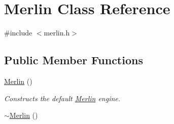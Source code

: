 \hypertarget{classMerlin}{}\section{Merlin Class Reference}
\label{classMerlin}


{\ttfamily \#include $<$merlin.\+h$>$}

\subsection*{Public Member Functions}
\begin{DoxyCompactItemize}
\item 
\hypertarget{classMerlin_af65be93499637052ab723eebb3bf4508}{}\hyperlink{classMerlin_af65be93499637052ab723eebb3bf4508}{Merlin} ()\label{classMerlin_af65be93499637052ab723eebb3bf4508}

\begin{DoxyCompactList}\small\item\em Constructs the default \hyperlink{classMerlin}{Merlin} engine. \end{DoxyCompactList}\item 
\hypertarget{classMerlin_a12e78669d769bd7540fd1ef272151cb1}{}\hyperlink{classMerlin_a12e78669d769bd7540fd1ef272151cb1}{$\sim$\+Merlin} ()\label{classMerlin_a12e78669d769bd7540fd1ef272151cb1}


\end{DoxyCompactItemize}
